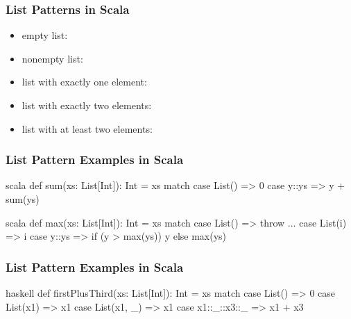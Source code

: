 \documentclass[dvipsnames]{beamer}
\theoremstyle{plain}
\begin{document}
\begin{frame}[fragile]
  \frametitle{List Patterns in Scala}

  \begin{itemize}
    \item empty list: 
    \item nonempty list: 
    \item list with exactly one element: 
    \item list with exactly two elements: 
    \item list with at least two elements: 
  \end{itemize}
\end{frame}

\begin{frame}[fragile]
  \frametitle{List Pattern Examples in Scala}

  \begin{example}
    \begin{pygments}{scala}
def sum(xs: List[Int]): Int =
    xs match {
        case List() => 0
        case y::ys => y + sum(ys)
    }
    \end{pygments}
  \end{example}

  \pause
  \begin{example}
    \begin{pygments}{scala}
def max(xs: List[Int]): Int =
    xs match {
        case List() => throw ...
        case List(i) => i
        case y::ys => if (y > max(ys)) y else max(ys)
    }
    \end{pygments}
  \end{example}
\end{frame}

\begin{frame}[fragile]
  \frametitle{List Pattern Examples in Scala}

  \begin{example}
    \begin{pygments}{haskell}
def firstPlusThird(xs: List[Int]): Int =
    xs match {
        case List() => 0
        case List(x1) => x1
        case List(x1, _) => x1
        case x1::_::x3::_ => x1 + x3
    }
    \end{pygments}
  \end{example}
\end{frame}
\end{document}
